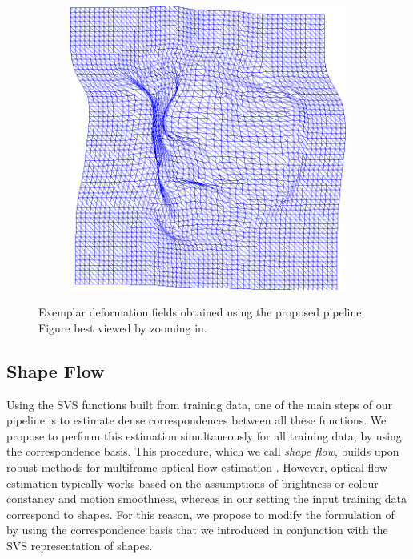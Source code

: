 \begin{figure}[t!]
\begin{subfigure}[b]{0.1\textwidth}
    \end{subfigure}
   	\hfill
    \begin{subfigure}[b]{0.1\textwidth}
            \includegraphics[width=\textwidth]{resources/Fig_Flows/8}
    \end{subfigure}
    \caption{Exemplar deformation fields obtained using the proposed pipeline. Figure best viewed by zooming in.}
    \label{fig:deformationfield}
\end{figure}






\subsection{Shape Flow}
\label{sec:shapeflow}


Using the SVS functions built from training data, one of the main steps of our pipeline is to estimate dense correspondences between all these functions. We propose to perform this estimation simultaneously for all training data, by using the correspondence basis. This procedure, which we call \emph{shape flow}, builds upon robust methods for multiframe optical flow estimation \cite{Garg:2013hu}. However, optical flow estimation typically works based on the assumptions of brightness or colour constancy and motion smoothness, whereas in our setting the input training data correspond to shapes. For this reason, we propose to modify the formulation of \cite{Garg:2013hu} by using the correspondence basis that we introduced in conjunction with the SVS representation of shapes.


